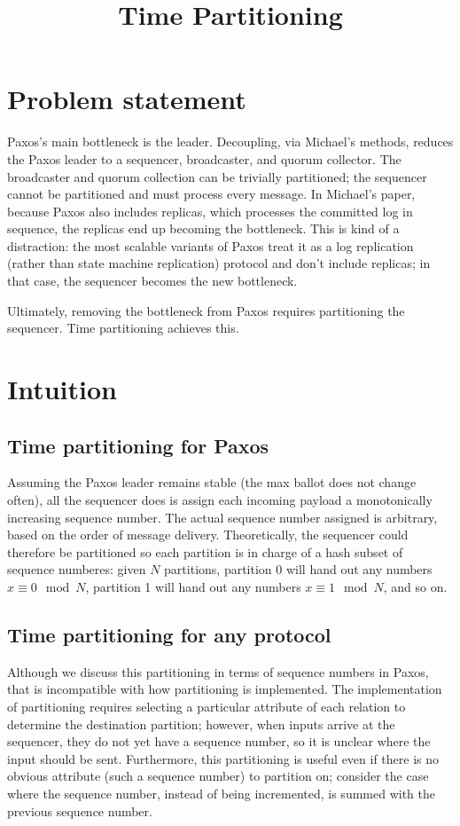 \documentclass{article}
\title{Time Partitioning}
\date{}
\author{}
\begin{document}
\maketitle

\section{Problem statement}
Paxos's main bottleneck is the leader.
Decoupling, via Michael's methods, reduces the Paxos leader to a sequencer, broadcaster, and quorum collector.
The broadcaster and quorum collection can be trivially partitioned; the sequencer cannot be partitioned and must process every message.
In Michael's paper, because Paxos also includes replicas, which processes the committed log in sequence, the replicas end up becoming the bottleneck.
This is kind of a distraction: the most scalable variants of Paxos treat it as a log replication (rather than state machine replication) protocol and don't include replicas; in that case, the sequencer becomes the new bottleneck.

Ultimately, removing the bottleneck from Paxos requires partitioning the sequencer.
Time partitioning achieves this.

\section{Intuition}
\subsection{Time partitioning for Paxos}
Assuming the Paxos leader remains stable (the max ballot does not change often), all the sequencer does is assign each incoming payload a monotonically increasing sequence number.
The actual sequence number assigned is arbitrary, based on the order of message delivery.
Theoretically, the sequencer could therefore be partitioned so each partition is in charge of a hash subset of sequence numberes: given $N$ partitions, partition 0 will hand out any numbers $x \equiv 0 \mod N$, partition 1 will hand out any numbers $x \equiv 1 \mod N$, and so on.

\subsection{Time partitioning for any protocol}
Although we discuss this partitioning in terms of sequence numbers in Paxos, that is incompatible with how partitioning is implemented.
The implementation of partitioning requires selecting a particular attribute of each relation to determine the destination partition; however, when inputs arrive at the sequencer, they do not yet have a sequence number, so it is unclear where the input should be sent.
Furthermore, this partitioning is useful even if there is no obvious attribute (such a sequence number) to partition on; consider the case where the sequence number, instead of being incremented, is summed with the previous sequence number.
\end{document}
